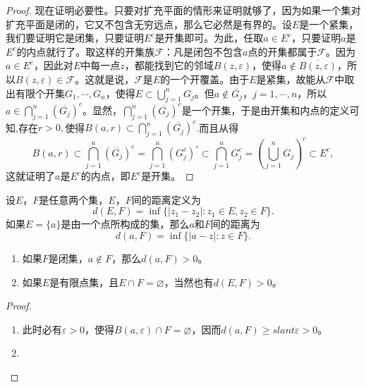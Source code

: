 \documentclass[../../main.tex]{subfiles}
\begin{document}
\begin{proof}
现在证明必要性。只要对扩充平面的情形来证明就够了，因为如果一个集对扩充平面是闭的，它又不包含无穷远点，那么它必然是有界的。设\(E\)是一个紧集，我们要证明它是闭集，只要证明\(E^c\)是开集即可。为此，任取\(a \in E^c\)，只要证明\(a\)是\(E^c\)的内点就行了。取这样的开集族\(\mathscr{F}\)：凡是闭包不包含\(a\)点的开集都属于\(\mathscr{F}\)。因为\(a \in E^c\)，因此对\(E\)中每一点\(z\)，都能找到它的邻域\(B(z, \varepsilon)\)，使得\(a \notin \overline{B(z, \varepsilon)}\)，所以\(B(z, \varepsilon) \in \mathscr{F}\)。这就是说，\(\mathscr{F}\)是\(E\)的一个开覆盖。由于\(E\)是紧集，故能从\(\mathscr{F}\)中取出有限个开集\(G_1, \cdots, G_n\)，使得\(E \subset \bigcup_{j = 1}^n G_j\)。但\(a \notin \overline{G_j}\)，\(j = 1, \cdots, n\)，所以\(a \in \bigcap_{j = 1}^n (\overline{G_j})^c\)。显然，\(\bigcap_{j = 1}^n (\overline{G_j})^c\)是一个开集，于是由开集和内点的定义可知,存在$r>0,$使得$B(a,r)\subset \bigcap_{j = 1}^n (\overline{G_j})^c$.而且从得
\[
B(a,r)\subset \bigcap_{j = 1}^n (\overline{G_j})^c = \bigcap_{j = 1}^n (G_j^c)^\circ \subset \bigcap_{j = 1}^n G_j^c = \left( \bigcup_{j = 1}^n G_j \right)^c \subset E^c,
\]
这就证明了\(a\)是\(E^c\)的内点，即\(E^c\)是开集。
\end{proof}

\begin{definition}
设\(E\)，\(F\)是任意两个集，\(E\)，\(F\)间的距离定义为
\[
d(E, F) = \inf\{ | z_1 - z_2 | : z_1 \in E, z_2 \in F \}.
\]
如果\(E = \{ a \}\)是由一个点所构成的集，那么\(a\)和\(F\)间的距离为
\[
d(a, F) = \inf\{ | a - z | : z \in F \}.
\]
\end{definition}

\begin{proposition}
\begin{enumerate}[(1)]
\item 如果\(F\)是闭集，\(a \notin F\)，那么\(d(a, F) > 0\)。

\item 如果\(E\)是有限点集，且\(E \cap F = \varnothing\)，当然也有\(d(E, F) > 0\)。
\end{enumerate}
\end{proposition}
\begin{proof}
\begin{enumerate}[(1)]
\item 此时必有\(\varepsilon > 0\)，使得\(B(a, \varepsilon) \cap F = \varnothing\)，因而\(d(a, F) \geqslant slant \varepsilon > 0\)。

\item 
\end{enumerate}
\end{proof}
\end{document}
